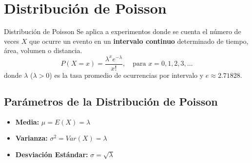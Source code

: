 \section{Distribución de Poisson}
\begin{definicion}{Distribución de Poisson}
Se aplica a experimentos donde se cuenta el número de veces $X$ que ocurre un evento en un \textbf{intervalo continuo} determinado de tiempo, área, volumen o distancia.
\begin{equation}
    P(X = x) = \frac{\lambda^x e^{-\lambda}}{x!}, \quad \text{para } x = 0, 1, 2, 3, \dots
\end{equation}
donde $\lambda$ ($\lambda > 0$) es la tasa promedio de ocurrencias por intervalo y $e \approx 2.71828$.
\end{definicion}

\subsection{Parámetros de la Distribución de Poisson}
\begin{itemize}
    \item \textbf{Media:} $\mu = E(X) = \lambda$
    \item \textbf{Varianza:} $\sigma^2 = Var(X) = \lambda$
    \item \textbf{Desviación Estándar:} $\sigma = \sqrt{\lambda}$
\end{itemize}


